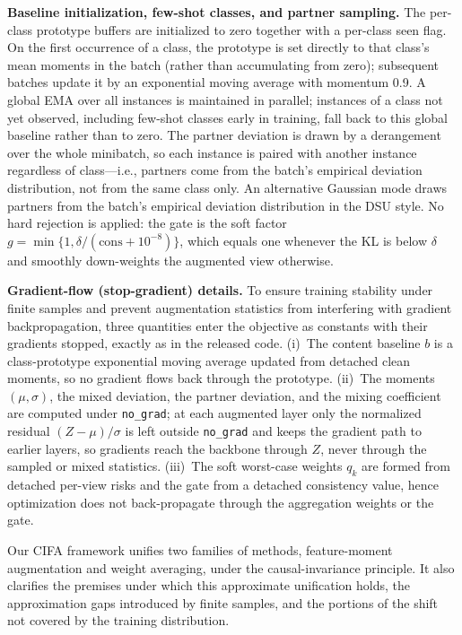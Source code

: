 \documentclass[electronics,article,submit,moreauthors]{Definitions/mdpi}
\begin{document}
\noindent\textbf{Baseline initialization, few-shot classes, and partner sampling.} The per-class prototype buffers are initialized to zero together with a per-class seen flag. On the first occurrence of a class, the prototype is set directly to that class's mean moments in the batch (rather than accumulating from zero); subsequent batches update it by an exponential moving average with momentum 0.9. A global EMA over all instances is maintained in parallel; instances of a class not yet observed, including few-shot classes early in training, fall back to this global baseline rather than to zero. The partner deviation is drawn by a derangement over the whole minibatch, so each instance is paired with another instance regardless of class---i.e., partners come from the batch's empirical deviation distribution, not from the same class only. An alternative Gaussian mode draws partners from the batch's empirical deviation distribution in the DSU style. No hard rejection is applied: the gate is the soft factor $g=\min\{1,\delta/(\mathrm{cons}+10^{-8})\}$, which equals one whenever the KL is below $\delta$ and smoothly down-weights the augmented view otherwise.

\noindent\textbf{Gradient-flow (stop-gradient) details.} To ensure training stability under finite samples and prevent augmentation statistics from interfering with gradient backpropagation, three quantities enter the objective as constants with their gradients stopped, exactly as in the released code. (i)~The content baseline $b$ is a class-prototype exponential moving average updated from detached clean moments, so no gradient flows back through the prototype. (ii)~The moments $(\mu,\sigma)$, the mixed deviation, the partner deviation, and the mixing coefficient are computed under \texttt{no\_grad}; at each augmented layer only the normalized residual $(Z-\mu)/\sigma$ is left outside \texttt{no\_grad} and keeps the gradient path to earlier layers, so gradients reach the backbone through $Z$, never through the sampled or mixed statistics. (iii)~The soft worst-case weights $q_k$ are formed from detached per-view risks and the gate from a detached consistency value, hence optimization does not back-propagate through the aggregation weights or the gate.

Our CIFA framework unifies two families of methods, feature-moment augmentation and weight averaging, under the causal-invariance principle. It also clarifies the premises under which this approximate unification holds, the approximation gaps introduced by finite samples, and the portions of the shift not covered by the training distribution.
\end{document}
